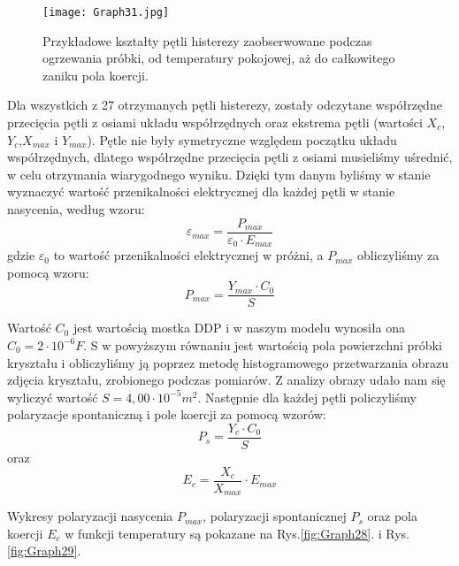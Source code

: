 \documentclass{article}
\begin{document}
\begin{figure}[!h]
	\centering
	\texttt{[image: Graph31.jpg]}
	\caption{Przykładowe kształty pętli histerezy zaobserwowane podczas ogrzewania próbki, od temperatury pokojowej, aż do całkowitego zaniku pola koercji.}
	\label{fig:Graph31}
\end{figure}

Dla wszystkich z 27 otrzymanych pętli histerezy, zostały odczytane współrzędne przecięcia pętli z osiami układu współrzędnych oraz ekstrema pętli (wartości $X_{c}$,$Y_{c}$,$X_{max}$ i $Y_{max}$). Pętle nie były symetryczne względem początku układu współrzędnych, dlatego współrzędne przecięcia pętli z osiami musieliśmy uśrednić, w celu otrzymania wiarygodnego wyniku. Dzięki tym danym byliśmy w stanie wyznaczyć wartość przenikalności elektrycznej dla każdej pętli w stanie nasycenia, według wzoru:
\begin{equation}
\varepsilon_{max}=\dfrac{P_{max}}{\varepsilon_{0}\cdot E_{max}}
\end{equation}
gdzie $\varepsilon_{0}$ to wartość przenikalności elektrycznej w próżni, a $P_{max}$ obliczyliśmy za pomocą wzoru:
\begin{equation}
P_{max}=\dfrac{Y_{max}\cdot C_{0}}{S}
\end{equation}

Wartość $C_{0}$ jest wartością mostka DDP i w naszym modelu wynosiła ona $C_{0}=2\cdot10^{-6} F$. S w powyższym równaniu jest wartością pola powierzchni próbki kryształu i obliczyliśmy ją poprzez metodę histogramowego przetwarzania obrazu zdjęcia kryształu, zrobionego podczas pomiarów. Z analizy obrazy udało nam się wyliczyć wartość $S=4,00\cdot10^{-5} m^{2}$. Następnie dla każdej pętli policzyliśmy polaryzacje spontaniczną i pole koercji za pomocą wzorów:
\begin{equation}
P_{s}=\dfrac{Y_{c}\cdot C_{0}}{S}
\end{equation}
oraz 
\begin{equation}
E_{c}=\dfrac{X_{c}}{X_{max}}\cdot E_{max}
\end{equation}

Wykresy polaryzacji nasycenia $P_{max}$, polaryzacji spontanicznej $P_{s}$ oraz pola koercji $E_{c}$ w funkcji temperatury są pokazane na Rys.\ref{fig:Graph28}. i Rys.\ref{fig:Graph29}.
\end{document}
